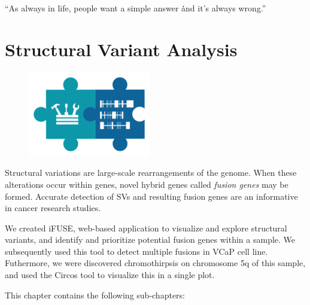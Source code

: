 \cleartorightpage
\begin{savequote}[75mm]
“As always in life, people want a simple answer \. \. \. and it’s always wrong.”
\end{savequote}

\chapter{Structural Variant Analysis}\label{chapter:fusiongenes}
\setcounter{figure}{-1}
\setcounter{table}{-1}
\setcounter{section}{-1}

\begin{figure}[t!]
\includegraphics[height=10em]{frontmatter/images/chapter-header-fusion-tools.png}
\end{figure}
\setcounter{figure}{-1}
\setcounter{table}{-1}
\setcounter{section}{-1}


Structural variations are large-scale rearrangements of the genome. When these alterations occur within genes, novel hybrid genes called \emph{fusion genes} may be formed. Accurate detection of SVs and resulting fusion genes are an informative in cancer research studies.

We created iFUSE, web-based application to visualize and explore structural variants, and identify and prioritize potential fusion genes within a sample. We subsequently used this tool to detect multiple fusions in VCaP cell line. Futhermore, we were discovered chromothirpsis on chromosome 5q of this sample, and used the Circos tool to visualize this in a single plot.

This chapter contains the following sub-chapters:

